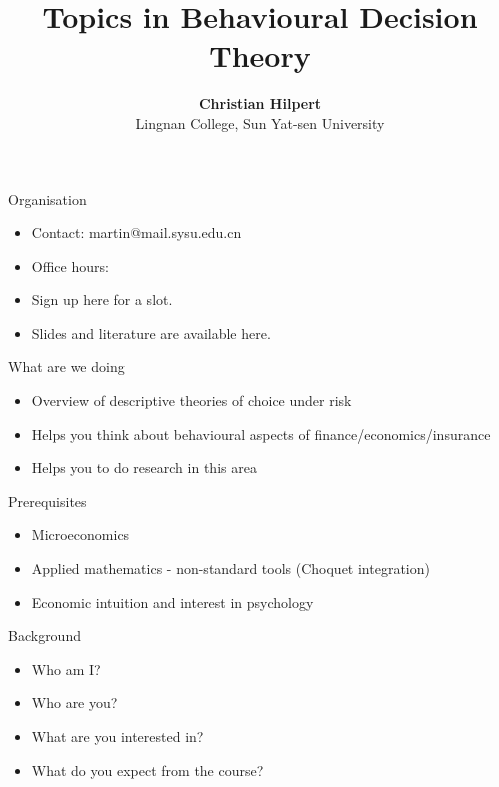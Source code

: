 \documentclass[11pt, aspectratio=169]{beamer}
\begin{document}
\title{Topics in Behavioural Decision  Theory}

\author[Christian Hilpert]
{
{\bf Christian Hilpert}\\
{\small Lingnan College, Sun Yat-sen University}\\[1ex]
}


\begin{frame}
    \titlepage
    \note{~}
\end{frame}

\begin{frame}{Organisation}
    \begin{itemize}
        \item Contact: martin@mail.sysu.edu.cn\bigskip
        \item Office hours: \bigskip
        \item Sign up here for a slot.\bigskip
        \item Slides and literature are available here.\bigskip
    \end{itemize}
\end{frame}

\begin{frame}{What are we doing}
    \begin{itemize}
        \item Overview of descriptive theories of choice under risk\bigskip
        \item Helps you think about behavioural aspects of finance/economics/insurance\bigskip
        \item Helps you to do research in this area\bigskip
    \end{itemize}
\end{frame}


\begin{frame}{Prerequisites}
    \begin{itemize}
        \item Microeconomics\bigskip
        \item Applied mathematics - non-standard tools (Choquet integration)\bigskip
        \item Economic intuition and interest in psychology\bigskip
    \end{itemize}
\end{frame}


\begin{frame}{Background}
    \begin{itemize}
        \item Who am I?\bigskip
        \item Who are you?\bigskip
        \item What are you interested in?\bigskip
        \item What do you expect from the course?\bigskip
    \end{itemize}
\end{frame}
\end{document}
